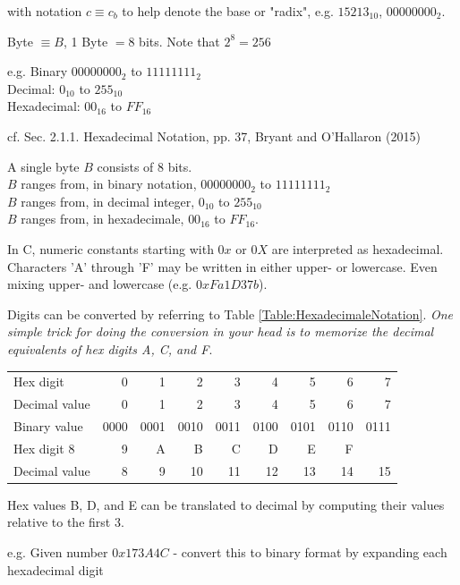 \documentclass[10pt]{amsart}
\begin{document}
\begin{multicols*}{2}
with notation $c \equiv c_b$ to help denote the base or "radix", e.g. $15213_{10}$, $00000000_2$.

Byte $\equiv B$, 1 Byte $ = 8$ bits. Note that $2^8 = 256$

e.g. Binary $00000000_2$ to $11111111_2$ \\
Decimal: $0_{10}$ to $255_{10}$ \\
Hexadecimal: $00_{16}$ to $FF_{16}$

cf. Sec. 2.1.1. Hexadecimal Notation, pp. 37, Bryant and O'Hallaron (2015) \cite{BrOH2016}

A single byte $B$ consists of 8 bits. \\
$B$ ranges from, in binary notation, $00000000_2$ to $11111111_2$ \\
$B$ ranges from, in decimal integer, $0_{10}$ to $255_{10}$ \\
$B$ ranges from, in hexadecimale, $00_{16}$ to ${FF}_{16}$. 

In C, numeric constants starting with $0x$ or $0X$ are interpreted as hexadecimal. Characters 'A' through 'F' may be written in either upper- or lowercase. Even mixing upper- and lowercase (e.g. $0xFa1D37b$).

Digits can be converted by referring to Table \ref{Table:HexadecimaleNotation}. \emph{One simple trick for doing the conversion in your head is to memorize the decimal equivalents of hex digits A, C, and F}.

\begin{center}
	\label{Table:HexadecimaleNotation}
	\begin{tabular}{ l | r | r | r | r | r | r | r | r | }
		\hline
		Hex digit & 0 & 1 & 2 & 3 & 4 & 5 & 6 & 7 \\
		Decimal value & 0 & 1 & 2 & 3 & 4 & 5 & 6 & 7 \\
		Binary value & 0000 & 0001 & 0010 & 0011 & 0100 & 0101 & 0110 & 0111 \\
		Hex digit 8 & 9 & A & B & C & D & E & F \\
		Decimal value & 8 & 9 & 10 & 11 & 12 & 13 & 14 & 15 \\
		\hline
	\end{tabular}
\end{center}

Hex values B, D, and E can be translated to decimal by computing their values relative to the first 3.

e.g. Given number $0x173A4C$ - convert this to binary format by expanding each hexadecimal digit


\end{multicols*}
\end{document}
